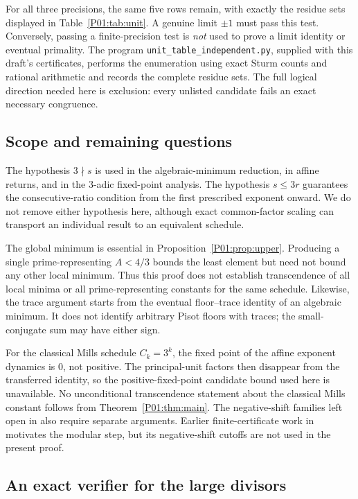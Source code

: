 \documentclass[11pt,a4paper]{article}
\theoremstyle{definition}\newtheorem{definition}[theorem]{Definition}
\theoremstyle{remark}\newtheorem{remark}[theorem]{Remark}
\begin{document}
For all three precisions, the same five rows remain, with exactly the
residue sets displayed in Table~\ref{P01:tab:unit}. A genuine limit
$\pm1$ must pass this test. Conversely, passing a finite-precision
test is \emph{not} used to prove a limit identity or eventual primality.
The program \texttt{unit\_table\_independent.py}, supplied with this
draft's certificates, performs the enumeration using exact Sturm counts
and rational arithmetic and records the complete residue sets.
The full logical direction needed here is exclusion: every unlisted
candidate fails an exact necessary congruence.

\subsection{Scope and remaining questions}

The hypothesis $3\nmid s$ is used in the algebraic-minimum reduction,
in affine returns, and in the $3$-adic fixed-point analysis.
The hypothesis $s\leq3r$ guarantees the consecutive-ratio condition
from the first prescribed exponent onward. We do not remove either
hypothesis here, although exact common-factor scaling can transport an
individual result to an equivalent schedule.

The global minimum is essential in
Proposition~\ref{P01:prop:upper}. Producing a single prime-representing
$A<4/3$ bounds the least element but need not bound any other local
minimum. Thus this proof does not establish transcendence of all local
minima or all prime-representing constants for the same schedule.
Likewise, the trace argument starts from the eventual floor--trace
identity of an algebraic minimum. It does not identify arbitrary Pisot
floors with traces; the small-conjugate sum may have either sign.

For the classical Mills schedule $C_k=3^k$, the fixed point of the
affine exponent dynamics is $0$, not positive. The principal-unit
factors then disappear from the transferred identity, so the
positive-fixed-point candidate bound used here is unavailable.
No unconditional transcendence statement about the classical Mills
constant follows from Theorem~\ref{P01:thm:main}. The negative-shift
families left open in \cite{K064} also require separate arguments.
Earlier finite-certificate work in \cite{K031} motivates the modular
step, but its negative-shift cutoffs are not used in the present proof.


\subsection{An exact verifier for the large divisors}\label{P01:app:certificate}
\end{document}
